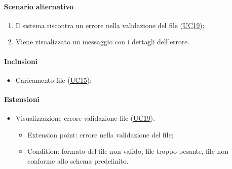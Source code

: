 \paragraph*{Scenario alternativo}
\begin{enumerate}
  \item Il sistema riscontra un errore nella validazione del file (\hyperref[UC19]{UC19});
  \item Viene visualizzato un messaggio con i dettagli dell'errore.
\end{enumerate}

\paragraph*{Inclusioni}
\begin{itemize}
  \item Caricamento file  (\hyperref[UC15]{UC15});
\end{itemize}

\paragraph*{Estensioni}
\begin{itemize}
  \item Visualizzazione errore validazione file (\hyperref[UC19]{UC19}).
  \begin{itemize}
    \item Extension point: errore nella validazione del file;
    \item Condition: formato del file non valido, file troppo pesante, file non conforme allo schema predefinito.
  \end{itemize}
\end{itemize}